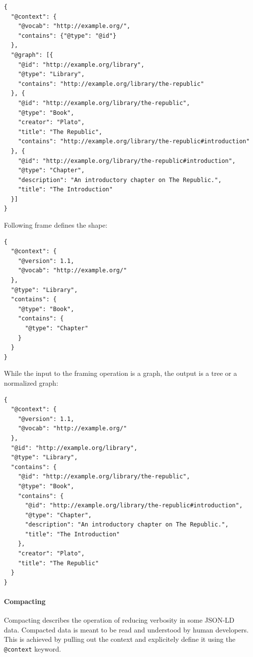 \lstset{language=JSON}
\begin{lstlisting}[caption=Data of a library as normalized graph]
{
  "@context": {
    "@vocab": "http://example.org/",
    "contains": {"@type": "@id"}
  },
  "@graph": [{
    "@id": "http://example.org/library",
    "@type": "Library",
    "contains": "http://example.org/library/the-republic"
  }, {
    "@id": "http://example.org/library/the-republic",
    "@type": "Book",
    "creator": "Plato",
    "title": "The Republic",
    "contains": "http://example.org/library/the-republic#introduction"
  }, {
    "@id": "http://example.org/library/the-republic#introduction",
    "@type": "Chapter",
    "description": "An introductory chapter on The Republic.",
    "title": "The Introduction"
  }]
}
\end{lstlisting}

Following frame defines the shape:

\lstset{language=JSON}
\begin{lstlisting}[caption=Frame for the framing operation]
{
  "@context": {
    "@version": 1.1,
    "@vocab": "http://example.org/"
  },
  "@type": "Library",
  "contains": {
    "@type": "Book",
    "contains": {
      "@type": "Chapter"
    }
  }
}
\end{lstlisting}

While the input to the framing operation is a graph, the output is a tree or a normalized graph:

\lstset{language=JSON}
\begin{lstlisting}[caption=Framed data of a library]
{
  "@context": {
    "@version": 1.1,
    "@vocab": "http://example.org/"
  },
  "@id": "http://example.org/library",
  "@type": "Library",
  "contains": {
    "@id": "http://example.org/library/the-republic",
    "@type": "Book",
    "contains": {
      "@id": "http://example.org/library/the-republic#introduction",
      "@type": "Chapter",
      "description": "An introductory chapter on The Republic.",
      "title": "The Introduction"
    },
    "creator": "Plato",
    "title": "The Republic"
  }
}
\end{lstlisting}

\paragraph{Compacting}\label{jsonldcompacting}

Compacting describes the operation of reducing verbosity in some JSON-LD data. Compacted data is meant to be read and understood by human developers. This is achieved by pulling out the context and explicitely define it using the \lstinline{@context} keyword.

